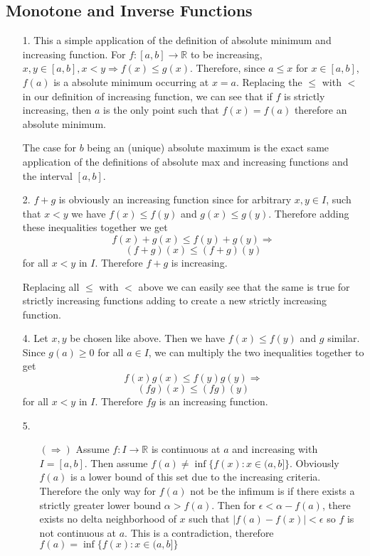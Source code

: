 \documentclass[letter paper, 11pt]{article}
\begin{document}
\subsection{Monotone and Inverse Functions}
\begin{itemize}
    \item[1.] This a simple application of the definition of absolute minimum and increasing function. For $f:[a,b]\rightarrow\mathbb{R}$ to be increasing, $x,y\in[a,b], x<y\Rightarrow f(x)\leq g(x)$. Therefore, since $a\leq x$ for $x\in[a,b]$, $f(a)$ is a absolute minimum occurring at $x=a$. Replacing the $\leq$ with $<$ in our definition of increasing function, we can see that if $f$ is strictly increasing, then $a$ is the only point such that $f(x)=f(a)$ therefore an absolute minimum. 
    
    The case for $b$ being an (unique) absolute maximum is the exact same application of the definitions of absolute max and increasing functions and the interval $[a,b]$.
    
    \item[2.] $f+g$ is obviously an increasing function since for arbitrary $x,y\in I$, such that $x<y$ we have $f(x)\leq f(y)$ and $g(x)\leq g(y)$. Therefore adding these inequalities together we get $$f(x)+g(x) \leq f(y)+g(y) \Rightarrow$$
    $$(f+g)(x) \leq (f+g)(y)$$ for all $x<y$ in $I$. Therefore $f+g$ is increasing.
    
    Replacing all $\leq$ with $<$ above we can easily see that the same is true for strictly increasing functions adding to create a new strictly increasing function.
    
    \item[4.] Let $x,y$ be chosen like above. Then we have $f(x)\leq f(y)$ and $g$ similar. Since $g(a)\geq0$ for all $a\in I$, we can multiply the two inequalities together to get
    $$f(x)g(x)\leq f(y)g(y) \Rightarrow$$
    $$(fg)(x)\leq (fg)(y)$$
    for all $x<y$ in $I$. Therefore $fg$ is an increasing function.
    
    \item[5.] 
    \begin{itemize}
        \item[$(\Rightarrow)$] Assume $f:I\rightarrow\mathbb{R}$ is continuous at $a$ and increasing with $I=[a,b]$. Then assume $f(a)\not=\inf\{f(x):x\in(a,b]\}$. Obviously $f(a)$ is a lower bound of this set due to the increasing criteria. Therefore the only way for $f(a)$ not be the infimum is if there exists a strictly greater lower bound $\alpha>f(a)$. Then for $\epsilon<\alpha-f(a)$, there exists no delta neighborhood of $x$ such that $|f(a)-f(x)|<\epsilon$ so $f$ is not continuous at $a$. This is a contradiction, therefore $f(a)=\inf\{f(x):x\in(a,b]\}$
        

\end{itemize}
\end{itemize}
\end{document}
